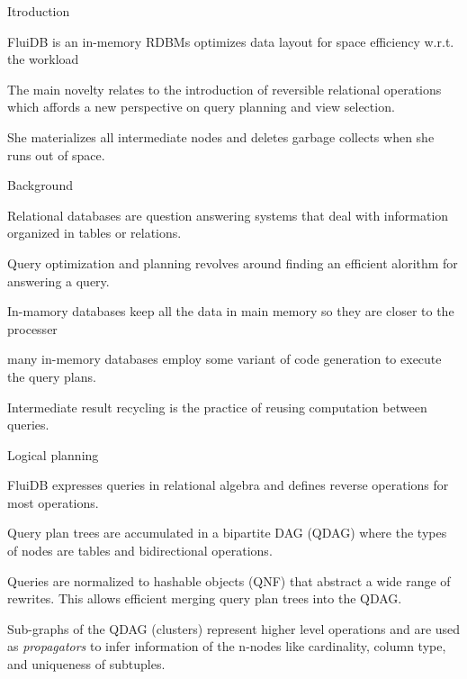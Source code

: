 
Itroduction

\begin{summary}
\item FluiDB is an in-memory RDBMs optimizes data layout for space
  efficiency w.r.t. the workload
\item The main novelty relates to the introduction of reversible
  relational operations which affords a new perspective on query
  planning and view selection.
\item She materializes all intermediate nodes and deletes garbage
  collects when she runs out of space.
\end{summary}

Background
\begin{summary}
\item Relational databases are question answering systems that deal
  with information organized in tables or relations.
\item Query optimization and planning revolves around finding an
  efficient alorithm for answering a query.
\item In-mamory databases keep all the data in main memory so they are
  closer to the processer
\item many in-memory databases employ some variant of code generation
  to execute the query plans.
\item Intermediate result recycling is the practice of reusing
  computation between queries.
\end{summary}

Logical planning
\begin{summary}
\item FluiDB expresses queries in relational algebra and defines
  reverse operations for most operations.
\item Query plan trees are accumulated in a bipartite DAG (QDAG) where
  the types of nodes are tables and bidirectional operations.
\item Queries are normalized to hashable objects (QNF) that abstract a
  wide range of rewrites. This allows efficient merging query plan
  trees into the QDAG.
\item Sub-graphs of the QDAG (clusters) represent higher level
  operations and are used as \emph{propagators} to infer information
  of the n-nodes like cardinality, column type, and uniqueness of
  subtuples.
\end{summary}

